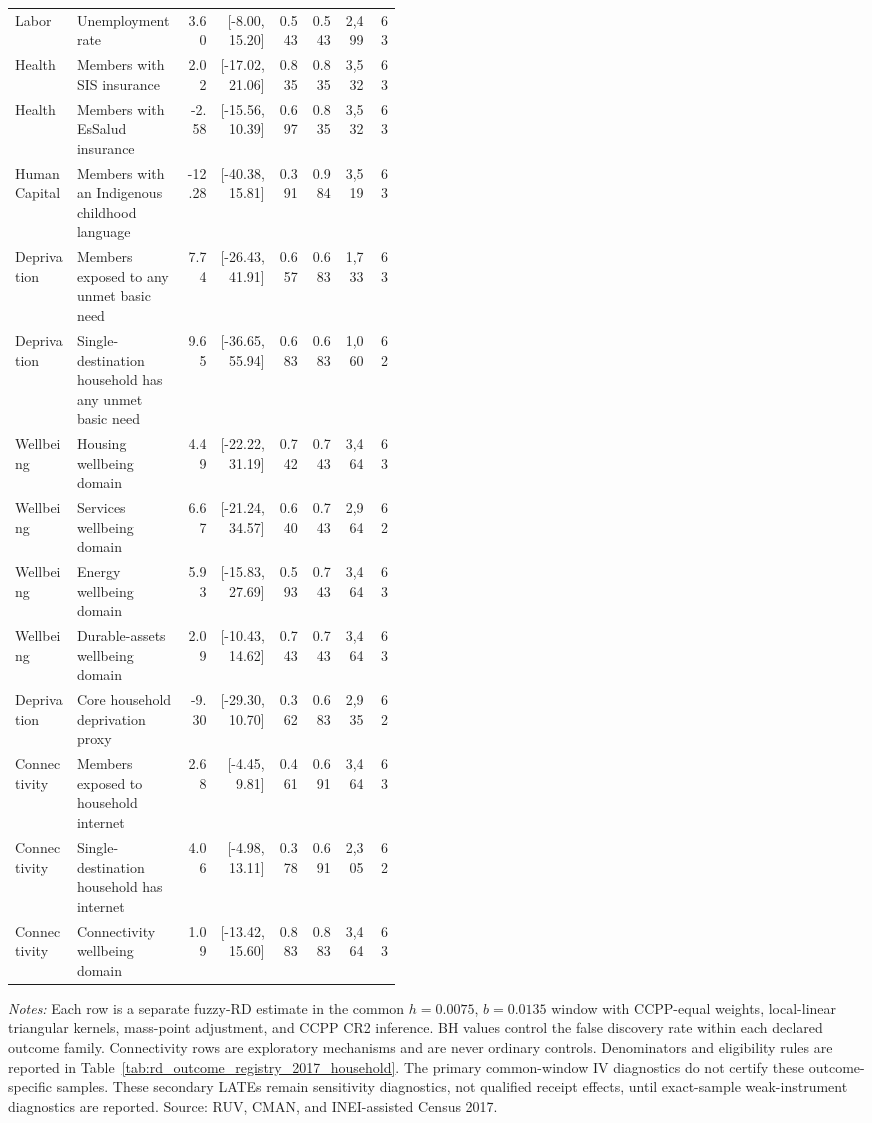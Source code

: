 \begin{longtable}{p{0.16\linewidth}p{0.29\linewidth}rrrrrr}
Labor & Unemployment rate & 3.60 & [-8.00, 15.20] & 0.543 & 0.543 & 2,499 & 63 \\
Health & Members with SIS insurance & 2.02 & [-17.02, 21.06] & 0.835 & 0.835 & 3,532 & 63 \\
Health & Members with EsSalud insurance & -2.58 & [-15.56, 10.39] & 0.697 & 0.835 & 3,532 & 63 \\
Human Capital & Members with an Indigenous childhood language & -12.28 & [-40.38, 15.81] & 0.391 & 0.984 & 3,519 & 63 \\
Deprivation & Members exposed to any unmet basic need & 7.74 & [-26.43, 41.91] & 0.657 & 0.683 & 1,733 & 63 \\
Deprivation & Single-destination household has any unmet basic need & 9.65 & [-36.65, 55.94] & 0.683 & 0.683 & 1,060 & 62 \\
Wellbeing & Housing wellbeing domain & 4.49 & [-22.22, 31.19] & 0.742 & 0.743 & 3,464 & 63 \\
Wellbeing & Services wellbeing domain & 6.67 & [-21.24, 34.57] & 0.640 & 0.743 & 2,964 & 62 \\
Wellbeing & Energy wellbeing domain & 5.93 & [-15.83, 27.69] & 0.593 & 0.743 & 3,464 & 63 \\
Wellbeing & Durable-assets wellbeing domain & 2.09 & [-10.43, 14.62] & 0.743 & 0.743 & 3,464 & 63 \\
Deprivation & Core household deprivation proxy & -9.30 & [-29.30, 10.70] & 0.362 & 0.683 & 2,935 & 62 \\
Connectivity & Members exposed to household internet & 2.68 & [-4.45, 9.81] & 0.461 & 0.691 & 3,464 & 63 \\
Connectivity & Single-destination household has internet & 4.06 & [-4.98, 13.11] & 0.378 & 0.691 & 2,305 & 62 \\
Connectivity & Connectivity wellbeing domain & 1.09 & [-13.42, 15.60] & 0.883 & 0.883 & 3,464 & 63 \\
\bottomrule
\end{longtable}
\begin{minipage}{0.98\linewidth}\footnotesize\textit{Notes:} Each row is a separate fuzzy-RD estimate in the common \(h=0.0075\), \(b=0.0135\) window with CCPP-equal weights, local-linear triangular kernels, mass-point adjustment, and CCPP CR2 inference. BH values control the false discovery rate within each declared outcome family. Connectivity rows are exploratory mechanisms and are never ordinary controls. Denominators and eligibility rules are reported in Table~\ref{tab:rd_outcome_registry_2017_household}. The primary common-window IV diagnostics do not certify these outcome-specific samples. These secondary LATEs remain sensitivity diagnostics, not qualified receipt effects, until exact-sample weak-instrument diagnostics are reported. Source: RUV, CMAN, and INEI-assisted Census 2017.\end{minipage}
\endgroup
